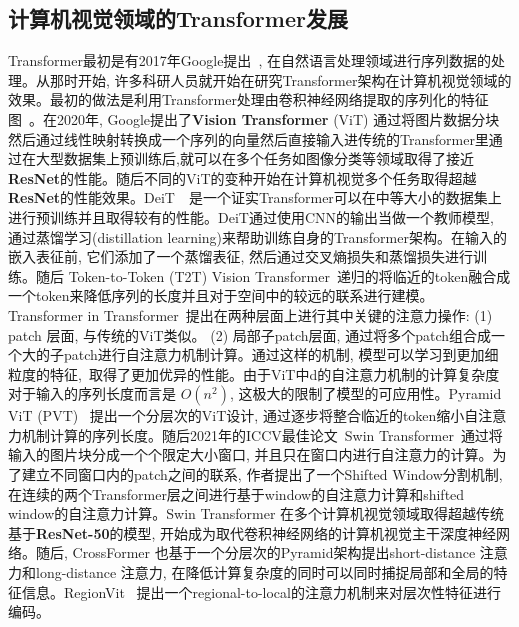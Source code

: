 \subsection{计算机视觉领域的Transformer发展}
Transformer最初是有2017年Google提出~\cite{vaswani2017attention}, 在自然语言处理领域进行序列数据的处理。从那时开始, 许多科研人员就开始在研究Transformer架构在计算机视觉领域的效果。最初的做法是利用Transformer处理由卷积神经网络提取的序列化的特征图~\cite{carion2020end, girdhar2019video, xie2021segmenting}。在2020年, Google提出了\textbf{Vision Transformer} (ViT) 通过将图片数据分块然后通过线性映射转换成一个序列的向量然后直接输入进传统的Transformer里通过在大型数据集上预训练后,就可以在多个任务如图像分类等领域取得了接近\textbf{ResNet}的性能。随后不同的ViT的变种开始在计算机视觉多个任务取得超越\textbf{ResNet}的性能效果。DeiT~\cite{touvron2021training}~是一个证实Transformer可以在中等大小的数据集上进行预训练并且取得较有的性能。DeiT通过使用CNN的输出当做一个教师模型, 通过蒸馏学习(distillation learning)来帮助训练自身的Transformer架构。在输入的嵌入表征前, 它们添加了一个蒸馏表征, 然后通过交叉熵损失和蒸馏损失进行训练。随后 Token-to-Token (T2T) Vision Transformer~\cite{yuan2021tokens}递归的将临近的token融合成一个token来降低序列的长度并且对于空间中的较远的联系进行建模。 Transformer in Transformer~\cite{han2021transformer}提出在两种层面上进行其中关键的注意力操作: (1) patch 层面, 与传统的ViT类似。 (2) 局部子patch层面, 通过将多个patch组合成一个大的子patch进行自注意力机制计算。通过这样的机制, 模型可以学习到更加细粒度的特征,~取得了更加优异的性能。由于ViT中d的自注意力机制的计算复杂度对于输入的序列长度而言是 $O(n^2)$, 这极大的限制了模型的可应用性。Pyramid ViT (PVT)~\cite{wang2021pyramid} 提出一个分层次的ViT设计, 通过逐步将整合临近的token缩小自注意力机制计算的序列长度。随后2021年的ICCV最佳论文~Swin Transformer~\cite{liu2021swin}通过将输入的图片块分成一个个限定大小窗口, 并且只在窗口内进行自注意力的计算。为了建立不同窗口内的patch之间的联系, 作者提出了一个Shifted Window分割机制, 在连续的两个Transformer层之间进行基于window的自注意力计算和shifted window的自注意力计算。Swin Transformer 在多个计算机视觉领域取得超越传统基于\textbf{ResNet-50}的模型, 开始成为取代卷积神经网络的计算机视觉主干深度神经网络。随后, CrossFormer
也基于一个分层次的Pyramid架构提出short-distance 注意力和long-distance 注意力, 在降低计算复杂度的同时可以同时捕捉局部和全局的特征信息。RegionVit~\cite{chen2021regionvit} 提出一个regional-to-local的注意力机制来对层次性特征进行编码。\par
